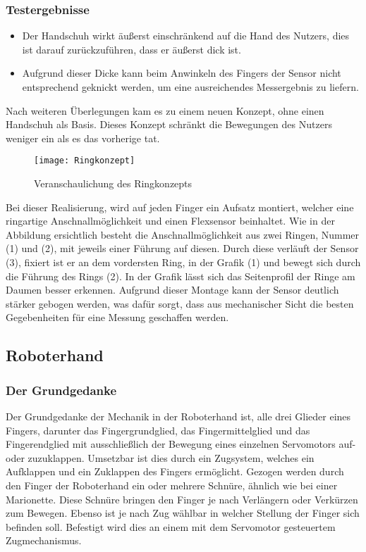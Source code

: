 \documentclass[titlepage,12pt,twoside]{article}
\begin{document}
\subsubsection{Testergebnisse}
\begin{itemize}
	\item Der Handschuh wirkt äußerst einschränkend auf die Hand des Nutzers, dies 
	ist darauf zurückzuführen, dass er äußerst dick ist.
	\item Aufgrund dieser Dicke kann beim Anwinkeln des Fingers der Sensor nicht 
	entsprechend geknickt werden, um eine ausreichendes Messergebnis zu liefern.
\end{itemize}
\hfill \break
Nach weiteren Überlegungen kam es zu einem neuen Konzept, ohne einen Handschuh als 
Basis. Dieses Konzept schränkt die Bewegungen des Nutzers weniger ein als es das vorherige tat. \\
\begin{figure}[H]
	\begin{center}
		\scalebox{0.5}
		{\texttt{[image: Ringkonzept]}}
		\caption{Veranschaulichung des Ringkonzepts}
		\label{fig:Ringkonzept}		
	\end{center}
\end{figure}
\hfill \break
Bei dieser Realisierung, wird auf jeden Finger ein Aufsatz montiert, welcher eine ringartige Anschnallmöglichkeit und einen Flexsensor beinhaltet.
Wie in der Abbildung ersichtlich besteht die Anschnallmöglichkeit aus zwei Ringen, Nummer (1) und (2), mit jeweils einer Führung auf diesen. Durch diese verläuft der Sensor (3), fixiert ist er an dem vordersten Ring, in der Grafik (1)
und bewegt sich durch die Führung des Rings (2). In der Grafik lässt sich das Seitenprofil der Ringe am Daumen besser erkennen.
Aufgrund dieser Montage kann der Sensor deutlich stärker gebogen werden, was dafür sorgt, dass aus mechanischer Sicht die besten Gegebenheiten für eine Messung geschaffen werden. \\

\newpage
\subsection{Roboterhand}
\subsubsection{Der Grundgedanke}
Der Grundgedanke der Mechanik in der Roboterhand ist, alle drei Glieder eines Fingers,
darunter das Fingergrundglied, das Fingermittelglied und das Fingerendglied mit 
ausschließlich der Bewegung eines einzelnen Servomotors auf- oder zuzuklappen. 
Umsetzbar ist dies durch ein Zugsystem, welches ein Aufklappen und ein Zuklappen 
des Fingers ermöglicht. Gezogen werden durch den Finger der Roboterhand ein oder mehrere 
Schnüre, ähnlich wie bei einer Marionette. Diese Schnüre bringen den Finger je nach 
Verlängern oder Verkürzen zum Bewegen. Ebenso ist je nach Zug wählbar in welcher 
Stellung der Finger sich befinden soll. Befestigt wird dies an einem mit dem Servomotor 
gesteuertem Zugmechanismus. \\
\end{document}
